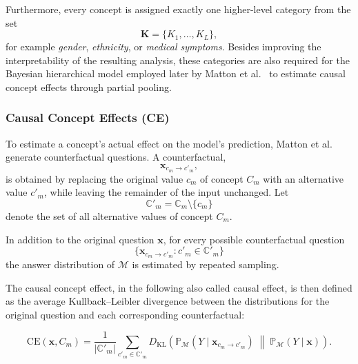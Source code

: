 Furthermore, every concept is assigned exactly one higher-level category from the set
\begin{equation}
	\mathbf{K}=\{K_1,\ldots,K_L\},
\end{equation}
for example \emph{gender}, \emph{ethnicity}, or \emph{medical symptoms}. Besides improving the interpretability of the resulting analysis, these categories are also required for the Bayesian hierarchical model employed later by Matton et al.~\cite{mattonWalkTalkMeasuring2024} to estimate causal concept effects through partial pooling.

\subsubsection{Causal Concept Effects (CE)}

To estimate a concept's actual effect on the model's prediction, Matton et al.~\cite{mattonWalkTalkMeasuring2024} generate counterfactual questions. A counterfactual,
\begin{equation}
	\mathbf{x}_{c_m \rightarrow c'_m},
\end{equation}
is obtained by replacing the original value $c_m$ of concept $C_m$ with an alternative value $c'_m$, while leaving the remainder of the input unchanged. Let
\begin{equation}
	\mathbb{C}'_m=\mathbb{C}_m\setminus\{c_m\}
\end{equation}
denote the set of all alternative values of concept $C_m$.

In addition to the original question $\mathbf{x}$, for every possible counterfactual question
\begin{equation}
	\{\mathbf{x}_{c_m \rightarrow c'_m} : c'_m \in \mathbb{C}'_m\}
\end{equation}
the answer distribution of $\mathcal{M}$ is estimated by repeated sampling.

The causal concept effect, in the following also called causal effect, is then defined as the average Kullback--Leibler divergence between the distributions for the original question and each corresponding counterfactual:

\begin{equation}
	\label{eq:ce}
	\mathrm{CE}(\mathbf{x},C_m)=
	\frac{1}{|\mathbb{C}'_m|}
	\sum_{c'_m \in \mathbb{C}'_m}
	D_{\mathrm{KL}}
	\left(
	\mathbb{P}_{\mathcal{M}}(Y \mid \mathbf{x}_{c_m \rightarrow c'_m})
	\;\middle\|\;
	\mathbb{P}_{\mathcal{M}}(Y \mid \mathbf{x})
	\right).
\end{equation}

